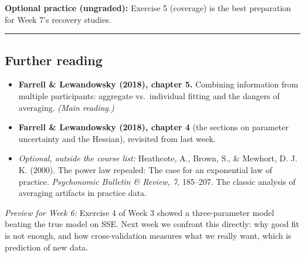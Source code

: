 \textbf{Optional practice (ungraded):} Exercise 5 (coverage) is the best
preparation for Week 7's recovery studies.

\begin{center}\rule{0.5\linewidth}{0.5pt}\end{center}

\subsection{Further reading}

\begin{itemize}
\tightlist
\item
  \textbf{Farrell \& Lewandowsky (2018), chapter 5.} Combining
  information from multiple participants: aggregate vs.~individual
  fitting and the dangers of averaging. \emph{(Main reading.)}
\item
  \textbf{Farrell \& Lewandowsky (2018), chapter 4} (the sections on
  parameter uncertainty and the Hessian), revisited from last week.
\item
  \emph{Optional, outside the course list:} Heathcote, A., Brown, S., \&
  Mewhort, D. J. K. (2000). The power law repealed: The case for an
  exponential law of practice. \emph{Psychonomic Bulletin \& Review, 7},
  185--207. The classic analysis of averaging artifacts in practice
  data.
\end{itemize}

\emph{Preview for Week 6:} Exercise 4 of Week 3 showed a three-parameter
model beating the true model on SSE. Next week we confront this
directly: why good fit is not enough, and how cross-validation measures
what we really want, which is prediction of new data.
